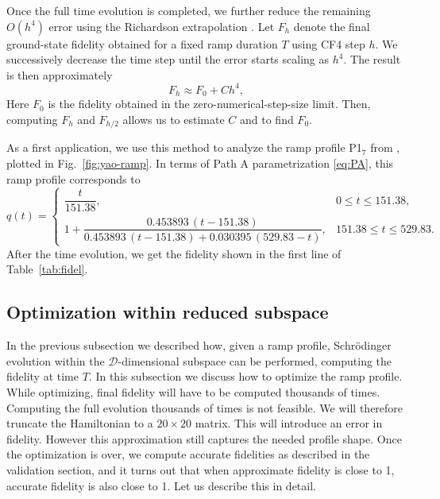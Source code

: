 \documentclass[a4paper,11pt]{article}
\theoremstyle{remark}
\theoremstyle{theorem}
\begin{document}
Once the full time evolution is completed, we further reduce the remaining $O(h^4)$ error using the Richardson extrapolation \cite{Richardson1911}.  Let $F_h$ denote the final ground-state fidelity obtained for a fixed ramp duration $T$ using CF4 step $h$.  We successively decrease the time step until the error starts scaling as $h^4$. The result is then approximately
\begin{equation}
F_{h}\approx F_{0}+C h^4,
\end{equation}
Here $F_{0}$ is the fidelity obtained in the zero-numerical-step-size limit.  Then, computing $F_h$ and $F_{h/2}$ allows us to estimate $ C$ and to find $F_{0}$.

As a first application, we use this method to analyze the ramp profile P1$_7$ from \cite{Fang:2024uyf}, plotted in Fig.~\ref{fig:yao-ramp}.
In terms of Path A parametrization \eqref{eq:PA}, this ramp profile corresponds to 
\begin{equation}
q(t)=
\begin{cases}
\dfrac{t}{151.38},
&0\leq t\leq151.38,\\[10pt]
1+
\dfrac{
0.453893\,(t-151.38)
}{
0.453893\,(t-151.38)
+
0.030395\,(529.83-t)
},
&151.38\leq t\leq529.83.
\end{cases}
\end{equation}
After the time evolution, we get the fidelity shown in the first line of Table~\ref{tab:fidel}. 

\subsection{Optimization within reduced subspace}\label{sec:reduced}

In the previous subsection we described how, given a ramp profile, Schr\"odinger evolution within the $\mathcal{D}$-dimensional subspace can be performed, computing the fidelity at time $T$. In this subsection we discuss how to optimize the ramp profile. While optimizing, final fidelity will have to be computed thousands of times. Computing the full evolution thousands of times is not feasible. We will therefore truncate the Hamiltonian to a $20\times 20$ matrix. This will introduce an error in fidelity. However this approximation still captures the needed profile shape. Once the optimization is over, we compute accurate fidelities as described in the validation section, and it turns out that when approximate fidelity is close to 1, accurate fidelity is also close to 1. Let us describe this in detail.
\end{document}
